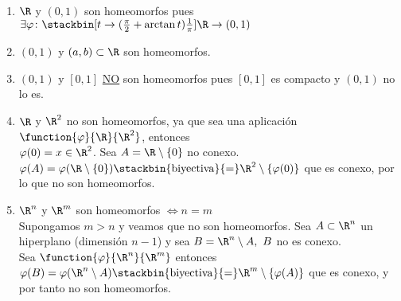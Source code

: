 	\begin{ejem}\ \\
	\begin{enumerate}[1)]
	\item$\R$ y $(0,1)$ son homeomorfos pues $\exists\varphi\colon\stackbin[t\rightarrow(\frac{\pi}{2}+\arctan t)\frac{1}{\pi}]{}{\R\rightarrow(0,1)}$
	\item $(0,1)$ y $(a,b)\subset\R$ son homeomorfos.
	\item $(0,1)$ y $[0,1]$ \underline{NO} son homeomorfos pues $[0,1]$ es compacto y $(0,1)$ no lo es.
	\item $\R$ y $\R^2$ no son homeomorfos, ya que sea una aplicación $\function{\varphi}{\R}{\R^2}$, entonces\\ $\varphi(0)=x\in\R^2$. Sea $A=\R\setminus\{0\}$ no conexo.\\
	$\varphi(A)=\varphi(\R\setminus\{0\})\stackbin{\mathrm{biyectiva}}{=}\R^2\setminus\{\varphi(0)\}$ que es conexo, por lo que no son homeomorfos.
	\item $\R^n$ y $\R^m$ son homeomorfos $\iff n=m$\\
	Supongamos $m>n$ y veamos que no son homeomorfos. Sea $A\subset\R^n$ un hiperplano (dimensión $n-1$) y sea $B=\R^n\setminus A,\ B$ no es conexo.\\
	Sea $\function{\varphi}{\R^n}{\R^m}$ entonces $\varphi(B)=\varphi(\R^n\setminus A) \stackbin{\mathrm{biyectiva}}{=}\R^m\setminus\{\varphi(A)\}$ que es conexo, y por tanto no son homeomorfos. 
	\end{enumerate}
	\end{ejem}
	\ \\
